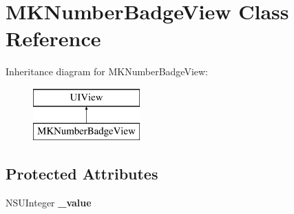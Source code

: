 \hypertarget{interface_m_k_number_badge_view}{\section{M\+K\+Number\+Badge\+View Class Reference}
\label{interface_m_k_number_badge_view}
}
Inheritance diagram for M\+K\+Number\+Badge\+View\+:\begin{figure}[H]
\begin{center}
\leavevmode
\includegraphics[height=2.000000cm]{interface_m_k_number_badge_view}
\end{center}
\end{figure}
\subsection*{Protected Attributes}
\begin{DoxyCompactItemize}
\item 
\hypertarget{interface_m_k_number_badge_view_a26701201c6ad4c4448dbac97c788bab6}{N\+S\+U\+Integer {\bfseries \+\_\+value}}\label{interface_m_k_number_badge_view_a26701201c6ad4c4448dbac97c788bab6}

\end{DoxyCompactItemize}
